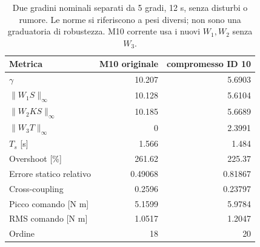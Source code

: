 \begin{table}[htbp]\centering\small
\begin{tabular}{lrr}\toprule
Metrica & M10 originale & compromesso ID 10 \\\midrule
$\gamma$ & 10.207 & 5.6903 \\
$\|W_1S\|_\infty$ & 10.128 & 5.6104 \\
$\|W_2KS\|_\infty$ & 10.185 & 5.6689 \\
$\|W_3T\|_\infty$ & 0 & 2.3991 \\
$T_s$ [s] & 1.566 & 1.484 \\
Overshoot [\%] & 261.62 & 225.37 \\
Errore statico relativo & 0.49068 & 0.81867 \\
Cross-coupling & 0.2596 & 0.23797 \\
Picco comando [N m] & 5.1599 & 5.9784 \\
RMS comando [N m] & 1.0517 & 1.2047 \\
Ordine & 18 & 20 \\
\bottomrule\end{tabular}
\caption{Due gradini nominali separati da 5 gradi, 12 s, senza disturbi o rumore. Le norme si riferiscono a pesi diversi; non sono una graduatoria di robustezza. M10 corrente usa i nuovi $W_1,W_2$ senza $W_3$.}
\label{tab:hinf-nuovo-confronto}\end{table}
